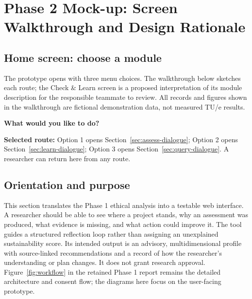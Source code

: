 \clearpage
\section{Phase 2 Mock-up: Screen Walkthrough and Design Rationale}
\label{sec:phase2-mockup}

\subsection{Home screen: choose a module}
\label{sec:phase2-home}
The prototype opens with three menu choices. The walkthrough below sketches each route; the Check \& Learn screen is a proposed interpretation of its module description for the responsible teammate to review. All records and figures shown in the walkthrough are fictional demonstration data, not measured TU/e results.

\begin{tcolorbox}[colback=gray!3,colframe=black!55,title={Home --- AI for a Greener Research Future},breakable]
\textbf{What would you like to do?}\par\medskip
{}\quad
{}\quad
{}\par\medskip
\textbf{Selected route:} Option 1 opens Section~\ref{sec:assess-dialogue}; Option 2 opens Section~\ref{sec:learn-dialogue}; Option 3 opens Section~\ref{sec:query-dialogue}. A researcher can return here from any route.
\end{tcolorbox}





\clearpage
\subsection{Orientation and purpose}
This section translates the Phase 1 ethical analysis into a testable web interface. A researcher should be able to see where a project stands, why an assessment was produced, what evidence is missing, and what action could improve it. The tool guides a structured reflection loop rather than assigning an unexplained sustainability score. Its intended output is an advisory, multidimensional profile with source-linked recommendations and a record of how the researcher's understanding or plan changes. It does not grant research approval. Figure~\ref{fig:workflow} in the retained Phase 1 report remains the detailed architecture and consent flow; the diagrams here focus on the user-facing prototype.

